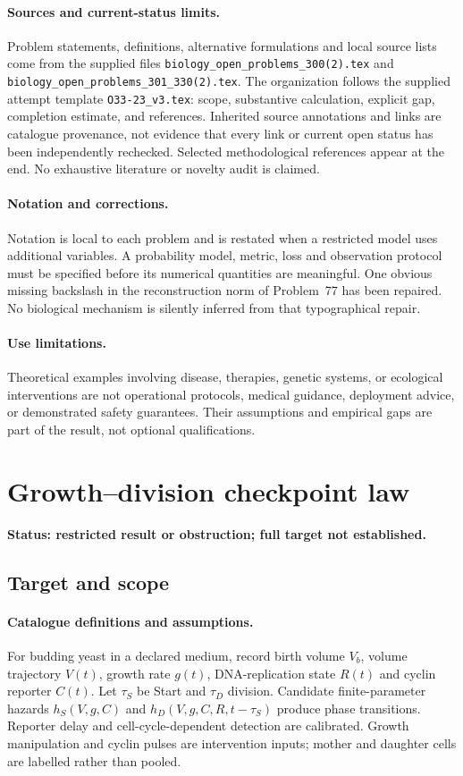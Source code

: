 \documentclass[11pt]{article}
\begin{document}
\paragraph{Sources and current-status limits.}
Problem statements, definitions, alternative formulations and local source lists
come from the supplied files
\texttt{biology\_open\_problems\_300(2).tex} and
\texttt{biology\_open\_problems\_301\_330(2).tex}.
The organization follows the supplied attempt template
\texttt{O33-23\_v3.tex}: scope, substantive calculation, explicit gap,
completion estimate, and references. Inherited source annotations and links are
catalogue provenance, not evidence that every link or current open status has
been independently rechecked. Selected methodological references appear at the
end. No exhaustive literature or novelty audit is claimed.

\paragraph{Notation and corrections.}
Notation is local to each problem and is restated when a restricted model uses
additional variables. A probability model, metric, loss and observation protocol
must be specified before its numerical quantities are meaningful. One obvious
missing backslash in the reconstruction norm of Problem~77 has been repaired.
No biological mechanism is silently inferred from that typographical repair.

\paragraph{Use limitations.}
Theoretical examples involving disease, therapies, genetic systems, or ecological
interventions are not operational protocols, medical guidance, deployment advice,
or demonstrated safety guarantees. Their assumptions and empirical gaps are part
of the result, not optional qualifications.


\section*{Growth–division checkpoint law}
\label{prob:020}
\noindent\textbf{Status: restricted result or obstruction; full target not established.}
\subsection{Target and scope}
\paragraph{Catalogue definitions and assumptions.}
For budding yeast in a declared medium, record birth volume $V_b$, volume trajectory $V(t)$, growth rate $g(t)$, DNA-replication state $R(t)$ and cyclin reporter $C(t)$. Let $\tau_S$ be Start and $\tau_D$ division. Candidate finite-parameter hazards $h_S(V,g,C)$ and $h_D(V,g,C,R,t-\tau_S)$ produce phase transitions. Reporter delay and cell-cycle-dependent detection are calibrated. Growth manipulation and cyclin pulses are intervention inputs; mother and daughter cells are labelled rather than pooled.
\end{document}

